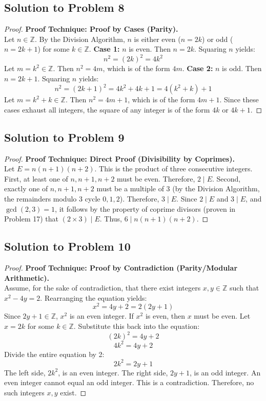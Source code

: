 \documentclass[12pt]{article}
\begin{document}
\subsection{Solution to Problem 8}
\begin{proof}
\textbf{Proof Technique: Proof by Cases (Parity).} \\
Let $n \in \mathbb{Z}$. By the Division Algorithm, $n$ is either even ($n = 2k$) or odd ($n = 2k + 1$) for some $k \in \mathbb{Z}$.
\textbf{Case 1:} $n$ is even. Then $n = 2k$. Squaring $n$ yields:
\[ n^2 = (2k)^2 = 4k^2 \]
Let $m = k^2 \in \mathbb{Z}$. Then $n^2 = 4m$, which is of the form $4m$.
\textbf{Case 2:} $n$ is odd. Then $n = 2k + 1$. Squaring $n$ yields:
\[ n^2 = (2k + 1)^2 = 4k^2 + 4k + 1 = 4(k^2 + k) + 1 \]
Let $m = k^2 + k \in \mathbb{Z}$. Then $n^2 = 4m + 1$, which is of the form $4m + 1$.
Since these cases exhaust all integers, the square of any integer is of the form $4k$ or $4k + 1$.
\end{proof}

\subsection{Solution to Problem 9}
\begin{proof}
\textbf{Proof Technique: Direct Proof (Divisibility by Coprimes).} \\
Let $E = n(n+1)(n+2)$. This is the product of three consecutive integers. 
First, at least one of $n, n+1, n+2$ must be even. Therefore, $2 \mid E$.
Second, exactly one of $n, n+1, n+2$ must be a multiple of 3 (by the Division Algorithm, the remainders modulo 3 cycle $0, 1, 2$). Therefore, $3 \mid E$.
Since $2 \mid E$ and $3 \mid E$, and $\gcd(2, 3) = 1$, it follows by the property of coprime divisors (proven in Problem 17) that $(2 \times 3) \mid E$. Thus, $6 \mid n(n+1)(n+2)$.
\end{proof}

\subsection{Solution to Problem 10}
\begin{proof}
\textbf{Proof Technique: Proof by Contradiction (Parity/Modular Arithmetic).} \\
Assume, for the sake of contradiction, that there exist integers $x, y \in \mathbb{Z}$ such that $x^2 - 4y = 2$. Rearranging the equation yields:
\[ x^2 = 4y + 2 = 2(2y + 1) \]
Since $2y + 1 \in \mathbb{Z}$, $x^2$ is an even integer. If $x^2$ is even, then $x$ must be even. Let $x = 2k$ for some $k \in \mathbb{Z}$. Substitute this back into the equation:
\[ (2k)^2 = 4y + 2 \]
\[ 4k^2 = 4y + 2 \]
Divide the entire equation by 2:
\[ 2k^2 = 2y + 1 \]
The left side, $2k^2$, is an even integer. The right side, $2y + 1$, is an odd integer. An even integer cannot equal an odd integer. This is a contradiction. Therefore, no such integers $x, y$ exist.
\end{proof}
\end{document}
